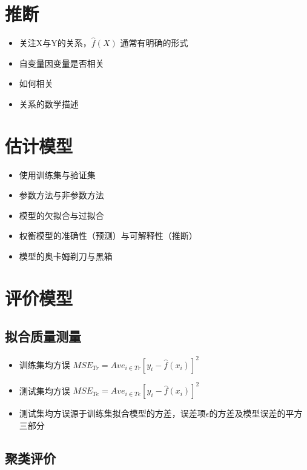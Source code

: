 \documentclass[]{book}
\providecommand{\tightlist}{%
  \setlength{\itemsep}{0pt}\setlength{\parskip}{0pt}}
\begin{document}
\section{推断}

\begin{itemize}
\tightlist
\item
  关注X与Y的关系，\(\hat f(X)\) 通常有明确的形式
\item
  自变量因变量是否相关
\item
  如何相关
\item
  关系的数学描述
\end{itemize}

\section{估计模型}

\begin{itemize}
\tightlist
\item
  使用训练集与验证集
\item
  参数方法与非参数方法
\item
  模型的欠拟合与过拟合
\item
  权衡模型的准确性（预测）与可解释性（推断）
\item
  模型的奥卡姆剃刀与黑箱
\end{itemize}

\section{评价模型}

\subsection{拟合质量测量}

\begin{itemize}
\tightlist
\item
  训练集均方误 \(MSE_{Tr} = Ave_{i \in Tr}[y_{i} − \hat f(x_i)]^2\)
\item
  测试集均方误 \(MSE_{Te} = Ave_{i \in Te}[y_{i} − \hat f(x_i)]^2\)
\item
  测试集均方误源于训练集拟合模型的方差，误差项\(\epsilon\)的方差及模型误差的平方三部分
\end{itemize}

\subsection{聚类评价}
\end{document}
